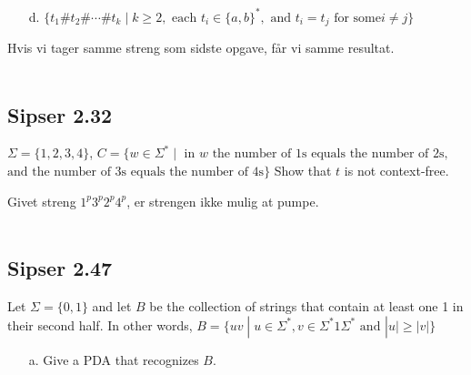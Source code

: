 \begin{enumerate}
	\item[d.] $\{t_{1}\#t_{2}\# \cdots \# t_{k}\;|\; k \ge 2, \text{ each } t_{i} \in \{a,b\}^{*}, \text{ and } t_{i}=t_{j} \text{ for some} i \ne j\}$
\end{enumerate}
Hvis vi tager samme streng som sidste opgave, får vi samme resultat.\\\\
\noindent
\subsection*{Sipser 2.32}
\noindent
$\Sigma = \{1,2,3,4\}$, $C = \{w \in \Sigma^{*} \; | \; \text{ in }w \text{ the number of 1s equals the number of 2s,}$\\
\noindent
$\text{and the number of 3s equals the number of 4s}\}$ Show that $t$ is not context-free.

Givet streng $1^{p}3^{p}2^{p}4^{p}$, er strengen ikke mulig at pumpe.\\\\

\noindent
\subsection*{Sipser 2.47}
\noindent

Let $\Sigma = \{0,1\}$ and let $B$ be the collection of strings that contain at least one 1 in their second half. In other words, $B = \{uv \; |\; u \in \Sigma^{*}, v \in \Sigma^{*}1\Sigma^{*} \text{ and } |u| \ge |v|\}$

\begin{enumerate}
	\item[a.] Give a PDA that recognizes $B$.
\end{enumerate}

